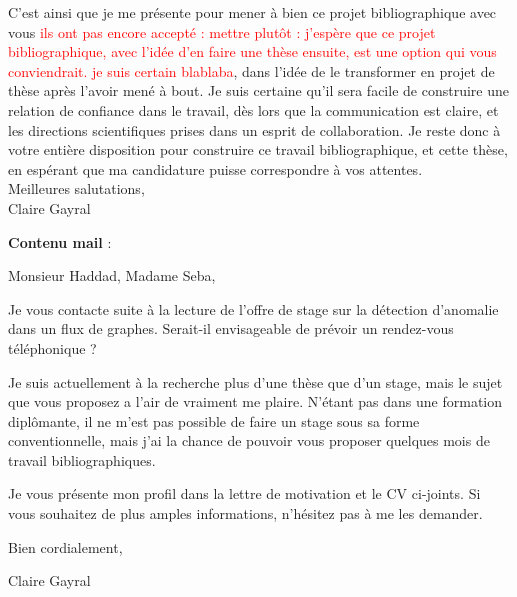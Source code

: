 \documentclass[a4paper,11pt]{article}
\begin{document}
C'est ainsi que je me présente pour mener à bien ce projet bibliographique avec vous \textcolor{red}{ils ont pas encore accepté : mettre plutôt : j'espère que ce projet bibliographique, avec l'idée d'en faire une thèse ensuite, est une option qui vous conviendrait. je suis certain blablaba}, dans l'idée de le transformer en projet de thèse après l'avoir mené à bout. Je suis certaine qu'il sera facile de construire une relation de confiance dans le travail, dès lors que la communication est claire, et les directions scientifiques prises dans un esprit de collaboration. Je reste donc à votre entière disposition pour construire ce travail bibliographique, et cette thèse, en espérant que ma candidature puisse correspondre à vos attentes. \\

Meilleures salutations, \\

Claire Gayral

\vspace{2cm}
\textbf{Contenu mail} : 


Monsieur Haddad, Madame Seba,

Je vous contacte suite à la lecture de l'offre de stage sur la détection d'anomalie dans un flux de graphes. Serait-il  envisageable de prévoir un rendez-vous téléphonique ? 

Je suis actuellement à la recherche plus d'une thèse que d'un stage, mais le sujet que vous proposez a l'air de vraiment me plaire. N'étant pas dans une formation diplômante, il ne m'est pas possible de faire un stage sous sa forme conventionnelle, mais j'ai la chance de pouvoir vous proposer quelques mois de travail bibliographiques. 

Je vous présente mon profil dans la lettre de motivation et le CV ci-joints. Si vous souhaitez de plus amples informations, n'hésitez pas à me les demander.  

Bien cordialement, 

Claire Gayral
\end{document}
